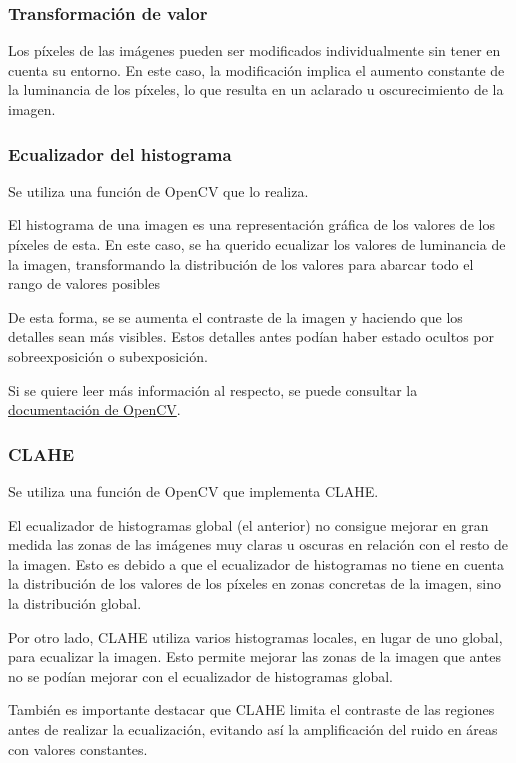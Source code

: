 \documentclass[12pt]{article}
\begin{document}
\subsubsection*{Transformación de valor}

Los píxeles de las imágenes pueden ser modificados individualmente sin tener en cuenta su entorno. En este caso, la modificación implica el aumento constante de la luminancia de los píxeles, lo que resulta en un aclarado u oscurecimiento de la imagen.

\subsubsection*{Ecualizador del histograma}

Se utiliza una función de OpenCV que lo realiza.

El histograma de una imagen es una representación gráfica de los valores de los píxeles de esta. En este caso, se ha querido ecualizar los valores de luminancia de la imagen, transformando la distribución de los valores para abarcar todo el rango de valores posibles

De esta forma, se se aumenta el contraste de la imagen y haciendo que los detalles sean más visibles. Estos detalles antes podían haber estado ocultos por sobreexposición o subexposición.

Si se quiere leer más información al respecto, se puede consultar la \href{https://docs.opencv.org/3.4/d4/d1b/tutorial_histogram_equalization.html}{documentación de OpenCV}.

\subsubsection*{CLAHE}

Se utiliza una función de OpenCV que implementa CLAHE.

El ecualizador de histogramas global (el anterior) no consigue mejorar en gran medida las zonas de las imágenes muy claras u oscuras en relación con el resto de la imagen. Esto es debido a que el ecualizador de histogramas no tiene en cuenta la distribución de los valores de los píxeles en zonas concretas de la imagen, sino la distribución global.

Por otro lado, CLAHE utiliza varios histogramas locales, en lugar de uno global, para ecualizar la imagen. Esto permite mejorar las zonas de la imagen que antes no se podían mejorar con el ecualizador de histogramas global.

También es importante destacar que CLAHE limita el contraste de las regiones antes de realizar la ecualización, evitando así la amplificación del ruido en áreas con valores constantes.
\end{document}
